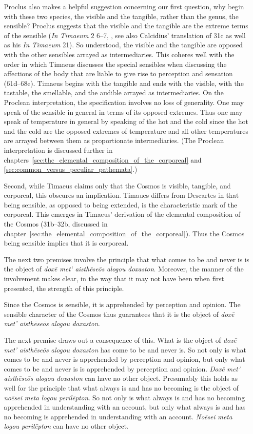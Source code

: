 Proclus also makes a helpful suggestion concerning our first question, why begin with these two species, the visible and the tangible, rather than the genus, the sensible? Proclus suggests that the visible and the tangible are the extreme terms of the sensible (\emph{In Timaeum} 2 6--7, \citealt{Diehl:1903re}, see also Calcidius' translation of 31c as well as his \emph{In Timaeum} 21). So understood, the visible and the tangible are opposed with the other sensibles arrayed as intermediaries. This coheres well with the order in which Timaeus discusses the special sensibles when discussing the affections of the body that are liable to give rise to perception and sensation (61d--68e). Timaeus begins with the tangible and ends with the visible, with the tastable, the smellable, and the audible arrayed as intermediaries. On the Proclean interpretation, the specification involves no loss of generality. One may speak of the sensible in general in terms of its opposed extremes. Thus one may speak of temperature in general by speaking of the hot and the cold since the hot and the cold are the opposed extremes of temperature and all other temperatures are arrayed between them as proportionate intermediaries. (The Proclean interpretation is discussed further in chapters~\ref{sec:the_elemental_composition_of_the_corporeal} and \ref{sec:common_versus_peculiar_pathemata}.)

Second, while Timaeus claims only that the Cosmos is visible, tangible, and corporeal, this obscures an implication. Timaues differs from Descartes in that being sensible, as opposed to being extended, is the characteristic mark of the corporeal. This emerges in Timaeus' derivation of the elemental composition of the Cosmos (31b--32b, discussed in chapter~\ref{sec:the_elemental_composition_of_the_corporeal}). Thus the  Cosmos being sensible implies that it is corporeal.

The next two premises involve the principle that what comes to be and never is is the object of \emph{doxē met’ aisthēseōs alogou doxaston}. Moreover, the manner of the involvement makes clear, in the way that it may not have been when first presented, the strength of this principle.

Since the Cosmos is sensible, it is apprehended by perception and opinion. The sensible character of the Cosmos thus guarantees that it is the object of \emph{doxē met’ aisthēseōs alogou doxaston}. 

The next premise draws out a consequence of this. What is the object of \emph{doxē met’ aisthēseōs alogou doxaston} has come to be and never is. So not only is what comes to be and never is apprehended by perception and opinion, but only what comes to be and never is is apprehended by perception and opinion. \emph{Doxē met’ aisthēseōs alogou doxaston} can have no other object. Presumably this holds as well for the principle that what always is and has no becoming is the object of \emph{noēsei meta logou perilēpton}. So not only is what always is and has no becoming apprehended in understanding with an account, but only what always is and has no becoming is apprehended in understanding with an account. \emph{Noēsei meta logou perilēpton} can have no other object.

